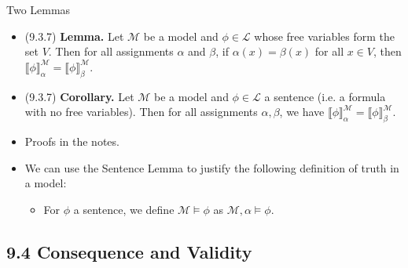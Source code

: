 \begin{frame}{Two Lemmas}

	\begin{itemize}

		\item (9.3.7) \textbf{Lemma.} Let $\mathcal{M}$ be a model and $\phi\in\mathcal{L}$ whose free variables form the set $V$. Then for all assignments $\alpha$ and $\beta$, if $\alpha(x)=\beta(x)$ for all $x\in V$, then $\llbracket\phi\rrbracket_\alpha^\mathcal{M}=\llbracket\phi\rrbracket_\beta^\mathcal{M}$.
		

\item (9.3.7) \textbf{Corollary.}	Let $\mathcal{M}$ be a model and $\phi\in\mathcal{L}$ a sentence (i.e. a formula with no free variables). Then for all assignments $\alpha,\beta$, we have $\llbracket\phi\rrbracket_\alpha^\mathcal{M}=\llbracket\phi\rrbracket_\beta^\mathcal{M}$.
		
		
		\item Proofs in the notes. 
		
		\item We can use the Sentence Lemma to justify the following definition of truth in a model:
		
		\begin{itemize}
		
			\item For $\phi$ a sentence, we define $\mathcal{M}\vDash\phi$ as $\mathcal{M},\alpha\vDash\phi$.
		
		\end{itemize}


\end{itemize}

\end{frame}

\subsection{9.4 Consequence and Validity}

